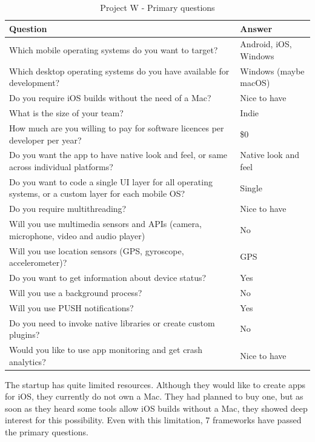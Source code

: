 \documentclass[english,master,public,dept460,male,cpdeclaration,oneside]{diploma}
\begin{document}
\begin{table}[!h]
	\centering
	\caption{Project W - Primary questions}
	\begin{tabular}{p{9cm} | p{4.5cm}}
		\toprule		
		\textbf{Question} &	\textbf{Answer}\\
		\midrule
		Which mobile operating systems do you want to target? &	Android, iOS, Windows \\
		Which desktop operating systems do you have available for development? & Windows (maybe macOS) \\
		Do you require iOS builds without the need of a Mac? & Nice to have \\
		What is the size of your team? & Indie \\
		How much are you willing to pay for software licences per developer per year? & \$0 \\
		Do you want the app to have native look and feel, or same across individual platforms? & Native look and feel \\
		Do you want to code a single UI layer for all operating systems, or a custom layer for each mobile OS? & Single \\
		Do you require multithreading? & Nice to have \\
		Will you use multimedia sensors and APIs (camera, microphone, video and audio player) & No  \\
		Will you use location sensors (GPS, gyroscope, accelerometer)? & GPS \\
		Do you want to get information about device status? & Yes \\
		Will you use a background process? & No \\
		Will you use PUSH notifications? & Yes \\
		Do you need to invoke native libraries or create custom plugins? & No \\
		Would you like to use app monitoring and get crash analytics? & Nice to have \\		
		\midrule
	\end{tabular}
\end{table}

The startup has quite limited resources. Although they would like to create apps for iOS, they currently do not own a Mac. They had planned to buy one, but as soon as they heard some tools allow iOS builds without a Mac, they showed deep interest for this possibility. Even with this limitation, 7 frameworks have passed the primary questions.
\end{document}
